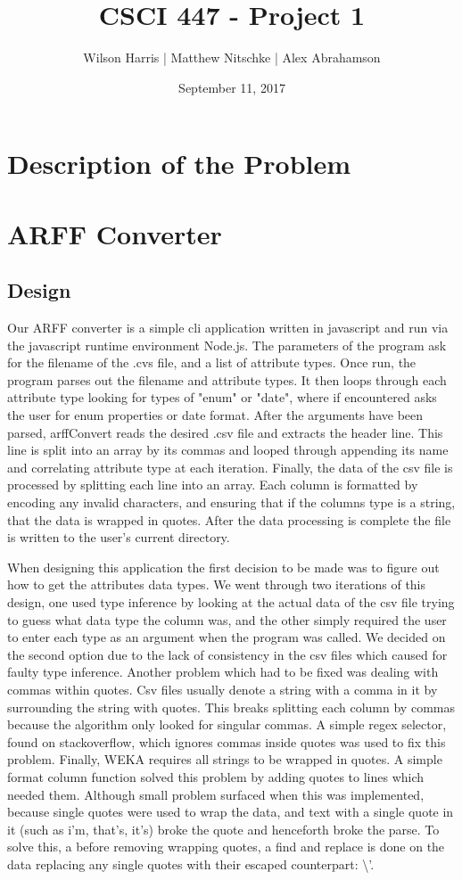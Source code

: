 \documentclass[11pt]{article} %
\title{\textbf{CSCI 447 - Project 1}}
\author{Wilson Harris | Matthew Nitschke | Alex Abrahamson }
\date{September 11, 2017}
\begin{document}
\maketitle

\section{Description of the Problem}

\section{ARFF Converter}

\subsection{Design}
Our ARFF converter is a simple cli application written in javascript and run via the javascript runtime environment Node.js. The parameters of the program ask for the filename of the .cvs file, and a list of attribute types. Once run, the program parses out the filename and attribute types. It then loops through each attribute type looking for types of "enum" or "date", where if encountered asks the user for enum properties or date format. After the arguments have been parsed, arffConvert reads the desired .csv file and extracts the header line. This line is split into an array by its commas and looped through appending its name and correlating attribute type at each iteration. Finally, the data of the csv file is processed by splitting each line into an array. Each column is formatted by encoding any invalid characters, and ensuring that if the columns type is a string, that the data is wrapped in quotes. After the data processing is complete the file is written to the user's current directory.

When designing this application the first decision to be made was to figure out how to get the attributes data types. We went through two iterations of this design, one used type inference by looking at the actual data of the csv file trying to guess what data type the column was, and the other simply required the user to enter each type as an argument when the program was called. We decided on the second option due to the lack of consistency in the csv files which caused for faulty type inference. Another problem which had to be fixed was dealing with commas within quotes. Csv files usually denote a string with a comma in it by surrounding the string with quotes. This breaks splitting each column by commas because the algorithm only looked for singular commas. A simple regex selector, found on stackoverflow, which ignores commas inside quotes was used to fix this problem. Finally, WEKA requires all strings to be wrapped in quotes. A simple format column function solved this problem by adding quotes to lines which needed them. Although small problem surfaced when this was implemented, because single quotes were used to wrap the data, and text with a single quote in it (such as i'm, that's, it's) broke the quote and henceforth broke the parse. To solve this, a before removing wrapping quotes, a find and replace is done on the data replacing any single quotes with their escaped counterpart: \textbackslash'.
\end{document}
